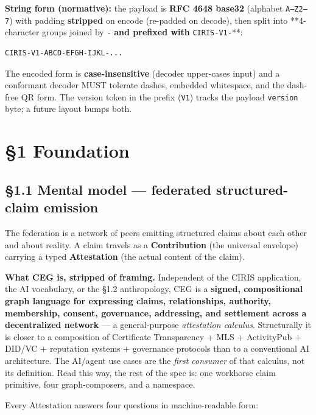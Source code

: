 \documentclass[10pt]{article}
\begin{document}
\textbf{String form (normative):} the payload is \textbf{RFC 4648 base32} (alphabet \texttt{A–Z2–7}) with padding \textbf{stripped} on encode (re-padded on decode), then split into **4-character groups joined by \texttt{-}\textbf{ and prefixed with }\texttt{CIRIS-V1-}**:


\begin{lstlisting}
CIRIS-V1-ABCD-EFGH-IJKL-...
\end{lstlisting}

The encoded form is \textbf{case-insensitive} (decoder upper-cases input) and a conformant decoder MUST tolerate dashes, embedded whitespace, and the dash-free QR form. The version token in the prefix (\texttt{V1}) tracks the payload \texttt{version} byte; a future layout bumps both.




\clearpage


\section*{§1 Foundation}


\subsection*{§1.1 Mental model — federated structured-claim emission}


The federation is a network of peers emitting structured claims about each other and about reality. A claim travels as a \textbf{Contribution} (the universal envelope) carrying a typed \textbf{Attestation} (the actual content of the claim).


\textbf{What CEG is, stripped of framing.} Independent of the CIRIS application, the AI vocabulary, or the §1.2 anthropology, CEG is a \textbf{signed, compositional graph language for expressing claims, relationships, authority, membership, consent, governance, addressing, and settlement across a decentralized network} — a general-purpose \textit{attestation calculus}. Structurally it is closer to a composition of Certificate Transparency + MLS + ActivityPub + DID/VC + reputation systems + governance protocols than to a conventional AI architecture. The AI/agent use cases are the \textit{first consumer} of that calculus, not its definition. Read this way, the rest of the spec is: one workhorse claim primitive, four graph-composers, and a namespace.


Every Attestation answers four questions in machine-readable form:
\end{document}
